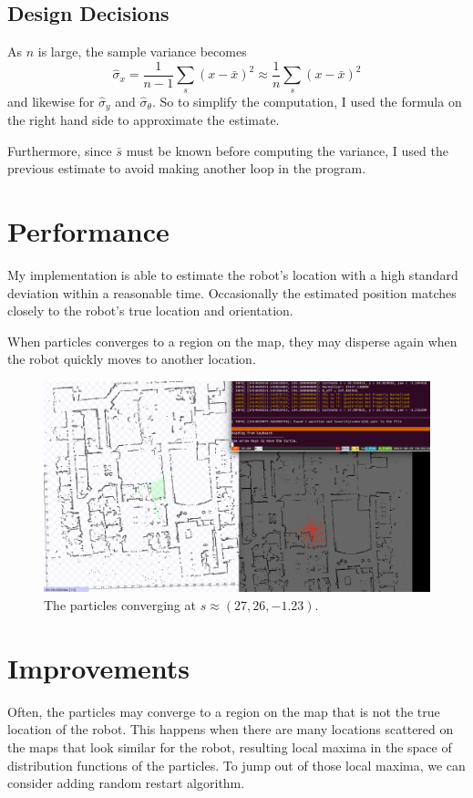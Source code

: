 \documentclass[10pt]{article}
\begin{document}
\subsection{Design Decisions}
As $n$ is large, the sample variance becomes
\begin{displaymath}
	\hat{\sigma}_x = \frac{1}{n-1}\sum_{s}(x-\bar{x})^2 \approx \frac{1}{n}\sum_{s}(x-\bar{x})^2
\end{displaymath}
and likewise for $\hat{\sigma}_y$ and $\hat{\sigma}_\theta$. So to simplify the computation, I used the formula on the right hand side to approximate the estimate. 

Furthermore, since $\bar{s}$ must be known before computing the variance, I used the previous estimate to avoid making another loop in the program. 

\section{Performance}
My implementation is able to estimate the robot's location with a high standard deviation within a reasonable time. Occasionally the estimated position matches closely to the robot's true location and orientation. 

When particles converges to a region on the map, they may disperse again when the robot quickly moves to another location. 

\begin{figure}[ht!]
\centering
\advance\leftskip-3cm
\includegraphics[width=180mm]{pic.png}
\caption{The particles converging at $s \approx (27,26,-1.23)$.}
\label{figCir1}
\end{figure}

\section{Improvements}
Often, the particles may converge to a region on the map that is not the true location of the robot. This happens when there are many locations scattered on the maps that look similar for the robot, resulting local maxima in the space of distribution functions of the particles. To jump out of those local maxima, we can consider adding random restart algorithm. 
\end{document}

